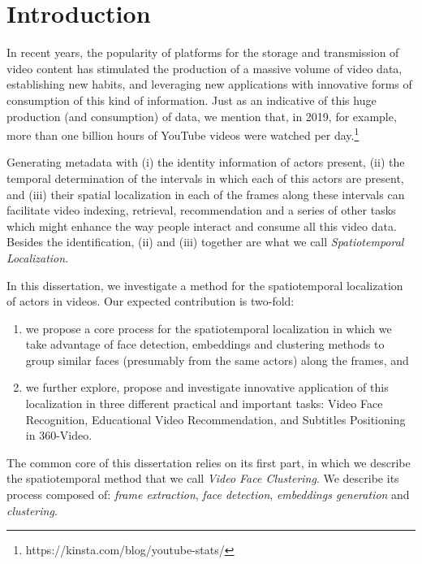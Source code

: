 \newpage

\chapter{Introduction}
\label{chap:introduction}

In recent years, the popularity of platforms for the storage and transmission of video content has stimulated the production of a massive volume of video data, establishing new habits, and leveraging new applications with innovative forms of consumption of this kind of information.
Just as an indicative of this huge production (and consumption) of data, we mention that, in 2019, for example, more than one billion hours of YouTube videos were watched per day.\footnote{https://kinsta.com/blog/youtube-stats/}

Generating metadata with (i) the identity information of  actors present, (ii) the temporal determination of the intervals in which each of this actors are present, and (iii) their spatial localization in each of the frames along these intervals can facilitate video indexing, retrieval, recommendation and a series of other tasks which might enhance the way people interact and consume all this video data. Besides the identification, (ii) and (iii) together are what we call \textit{Spatiotemporal Localization}. 

In this dissertation, we investigate a method for the spatiotemporal localization of actors in videos. Our expected contribution is two-fold: 
\begin{enumerate}
\item we propose a core process for the spatiotemporal localization in which we take advantage of face detection, embeddings and clustering methods to group similar faces (presumably from the same actors) along the frames, and \item we further explore, propose and investigate innovative application of this localization in three different practical and important tasks: Video Face Recognition, Educational Video Recommendation, and Subtitles Positioning in 360-Video.  
\end{enumerate}

The common core of this dissertation relies on its first part, in which we describe the spatiotemporal method that we call \textit{Video Face Clustering}. We describe its process composed of: \textit{frame extraction}, \textit{face detection}, \textit{embeddings generation} and \textit{clustering}. 

